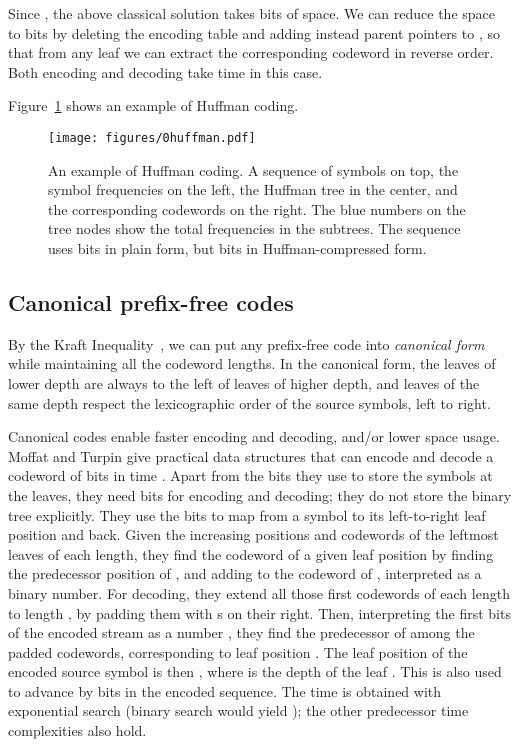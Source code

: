 \documentclass[preprint,12pt]{elsarticle}
\begin{document}
Since , the above classical solution takes 
 bits of space. We can reduce the space to 
 bits by deleting the encoding table and adding instead
parent pointers to , so that from any leaf we can extract the
corresponding codeword in reverse order. Both encoding and decoding take
 time in this case.

Figure~\ref{fig:huffman} shows an example of Huffman coding.

\begin{figure}[t]
\begin{center}
\texttt{[image: figures/0huffman.pdf]}
\end{center}
\vspace*{-5mm}
\caption{An example of Huffman coding. A sequence of symbols on top, the 
symbol frequencies on the left, the Huffman tree  in the center, and
the corresponding codewords on the right. The blue numbers on the tree nodes
show the total frequencies in the subtrees. The sequence uses 
bits in plain form, but  bits in Huffman-compressed form.}
\label{fig:huffman}
\end{figure}

\subsection{Canonical prefix-free codes}

By the Kraft Inequality~\cite{Kra49}, we can put any prefix-free code into 
{\em canonical form} \cite{SK64} while maintaining all the codeword lengths.
In the canonical form, the leaves of lower depth are always to the left of 
leaves of higher depth, and leaves of the same depth respect the lexicographic 
order of the source symbols, left to right. 

Canonical codes enable faster encoding and decoding, and/or lower space usage.
Moffat and Turpin \cite{MT97} give practical data structures that can encode
and decode a codeword of  bits in time . Apart from the
 bits they use to store the symbols at the leaves, they 
need  bits for encoding and decoding; they do not store the
binary tree  explicitly. They use the  bits
to map from a symbol  to its left-to-right leaf position  
and back. Given the increasing positions and codewords of the leftmost leaves
of each length, they find the codeword of a given leaf position  by finding 
the predecessor position  of , and adding  to the codeword of
, interpreted as a binary number. For decoding, they extend all those 
first codewords of each length to length , by padding them with s on 
their right. Then, interpreting the first  bits of the encoded stream
as a number , they find the predecessor  of  among the
padded codewords, corresponding to leaf position . The leaf position of the
encoded source symbol is then , where  is the 
depth of the leaf . This is also used to advance by  bits in the 
encoded sequence. The time  is obtained with exponential 
search (binary search would yield ); the other predecessor time complexities also hold.  
\end{document}
